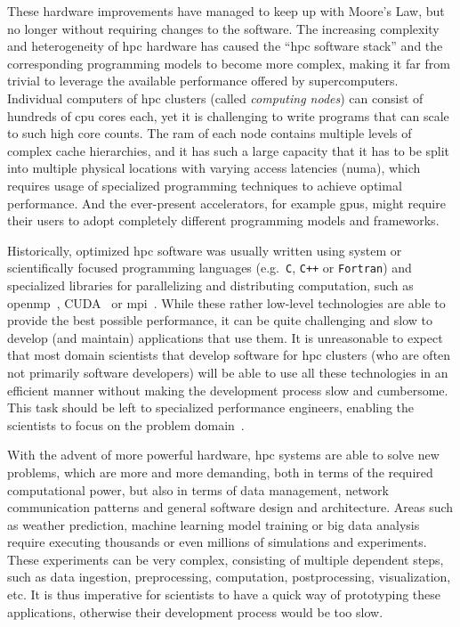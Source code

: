 These hardware improvements have managed to keep up with Moore's Law, but no longer without
requiring changes to the software. The increasing complexity and heterogeneity of
\gls{hpc} hardware has caused the ``\gls{hpc} software stack'' and the
corresponding programming models to become more complex, making it far from trivial to leverage the
available performance offered by supercomputers. Individual computers of \gls{hpc}
clusters (called \emph{computing nodes}) can consist of hundreds of \gls{cpu} cores
each, yet it is challenging to write programs that can scale to such high core counts. The
\gls{ram} of each node contains multiple levels of complex cache hierarchies, and it
has such a large capacity that it has to be split into multiple physical locations with varying
access latencies (\gls{numa}), which requires usage of specialized programming
techniques to achieve optimal performance. And the ever-present accelerators, for example
\glspl{gpu}, might require their users to adopt completely different programming models
and frameworks.

Historically, optimized \gls{hpc} software was usually written using system or
scientifically focused programming languages (e.g.~\texttt{C}, \texttt{C++}
or \texttt{Fortran}) and specialized libraries for parallelizing and distributing
computation, such as \gls{openmp}~\cite{openmp}, CUDA~\cite{cuda} or
\gls{mpi}~\cite{mpistudy}. While these rather low-level technologies are able
to provide the best possible performance, it can be quite challenging and slow to develop (and
maintain) applications that use them. It is unreasonable to expect that most domain scientists that
develop software for \gls{hpc} clusters (who are often not primarily software
developers) will be able to use all these technologies in an efficient manner without making the
development process slow and cumbersome. This task should be left to specialized performance
engineers, enabling the scientists to focus on the problem domain~\cite{dace}.

With the advent of more powerful hardware, \gls{hpc} systems are able to solve new
problems, which are more and more demanding, both in terms of the required computational power, but
also in terms of data management, network communication patterns and general software design and
architecture. Areas such as weather prediction, machine learning model training or big data
analysis require executing thousands or even millions of simulations and experiments. These
experiments can be very complex, consisting of multiple dependent steps, such as data ingestion,
preprocessing, computation, postprocessing, visualization, etc. It is thus imperative for
scientists to have a quick way of prototyping these applications, otherwise their development
process would be too slow.

